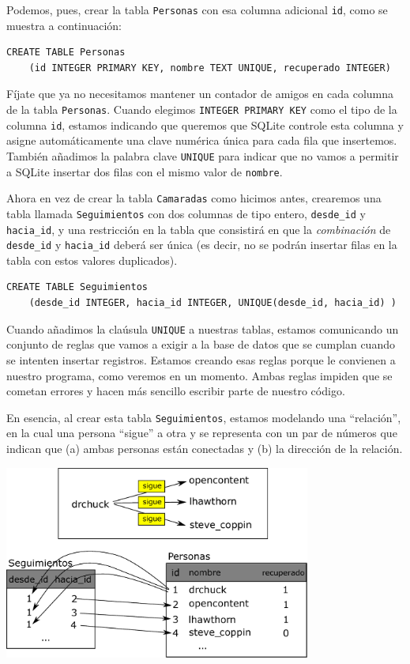 Podemos, pues, crear la tabla {\tt Personas} con esa columna adicional
{\tt id}, como se muestra a continuación:

\beforeverb
\begin{verbatim}
CREATE TABLE Personas
    (id INTEGER PRIMARY KEY, nombre TEXT UNIQUE, recuperado INTEGER)
\end{verbatim}
\afterverb
%
Fíjate que ya no necesitamos mantener un contador de amigos en cada columna
de la tabla {\tt Personas}.
Cuando elegimos {\tt INTEGER PRIMARY KEY} como el tipo de la columna {\tt id},
estamos indicando que queremos que SQLite controle esta columna y
asigne automáticamente una clave numérica única para cada fila que insertemos.
También añadimos la palabra clave {\tt UNIQUE} para indicar que no vamos
a permitir a SQLite insertar dos filas con el mismo valor de {\tt nombre}.

Ahora en vez de crear la tabla {\tt Camaradas} como hicimos antes, crearemos
una tabla llamada {\tt Seguimientos} con dos columnas de tipo entero,
\verb"desde_id" y \verb"hacia_id", y una restricción en la tabla que consistirá en que
la \emph{combinación} de \verb"desde_id" y \verb"hacia_id" deberá ser única
(es decir, no se podrán insertar filas en la tabla con estos valores duplicados).

\beforeverb
\begin{verbatim}
CREATE TABLE Seguimientos 
    (desde_id INTEGER, hacia_id INTEGER, UNIQUE(desde_id, hacia_id) )
\end{verbatim}
\afterverb
%
Cuando añadimos la claúsula {\tt UNIQUE} a nuestras tablas, estamos comunicando un conjunto
de reglas que vamos a exigir a la base de datos que se cumplan cuando se intenten insertar
registros. Estamos creando esas reglas porque le convienen a nuestro programa, como
veremos en un momento. Ambas reglas impiden que se cometan errores y hacen
más sencillo escribir parte de nuestro código.

En esencia, al crear esta tabla {\tt Seguimientos}, estamos modelando una
``relación'', en la cual una persona ``sigue'' a otra
y se representa con un par de números que indican que (a) ambas personas están
conectadas y (b) la dirección de la relación.

\beforefig
\centerline{\includegraphics[height=2.50in]{figs2/twitter.eps}}
\afterfig


